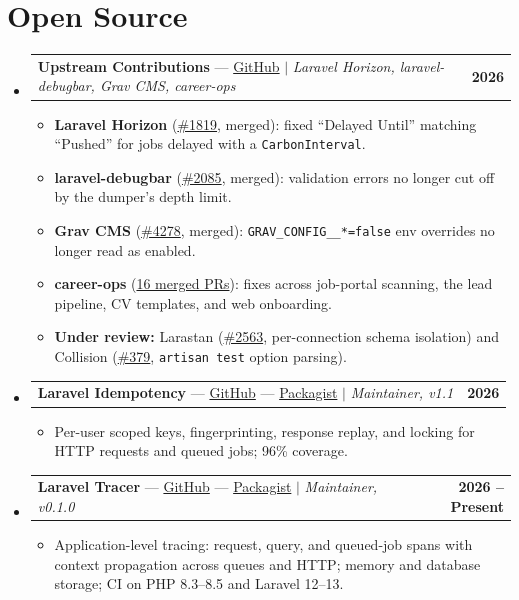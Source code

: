 \documentclass[letterpaper,10pt]{article}
\makeatletter
\newcommand{\resumeItem}[1]{\item\small{{#1 \vspace{-2pt}}}}
\newcommand{\resumeProjectHeading}[2]{
    \item
    \begin{tabular*}{0.97\textwidth}{l@{\extracolsep{\fill}}r}
      \small#1 & \textbf{\small #2} \\
    \end{tabular*}\vspace{-7pt}
}
\newcommand{\resumeSubHeadingListStart}{\begin{itemize}[leftmargin=0.15in, label={}]}
\newcommand{\resumeSubHeadingListEnd}{\end{itemize}}
\newcommand{\resumeItemListStart}{\begin{itemize}[label=--]}
\newcommand{\resumeItemListEnd}{\end{itemize}\vspace{-5pt}}
\makeatother
\begin{document}
\section{Open Source}
  \resumeSubHeadingListStart
    \resumeProjectHeading
      {\textbf{Upstream Contributions} --- \href{https://github.com/AdilAzhariOmsan}{GitHub} $|$ \emph{Laravel Horizon, laravel-debugbar, Grav CMS, career-ops}}{2026}
      \resumeItemListStart
        \resumeItem{\textbf{Laravel Horizon} (\href{https://github.com/laravel/horizon/pull/1819}{\#1819}, merged): fixed ``Delayed Until'' matching ``Pushed'' for jobs delayed with a \texttt{CarbonInterval}.}
        \resumeItem{\textbf{laravel-debugbar} (\href{https://github.com/fruitcake/laravel-debugbar/pull/2085}{\#2085}, merged): validation errors no longer cut off by the dumper's depth limit.}
        \resumeItem{\textbf{Grav CMS} (\href{https://github.com/getgrav/grav/pull/4278}{\#4278}, merged): \texttt{GRAV\_CONFIG\_\_*=false} env overrides no longer read as enabled.}
        \resumeItem{\textbf{career-ops} (\href{https://github.com/career-ops-hq/career-ops/pulls?q=is\%3Apr+author\%3AAdilAzhariOmsan+is\%3Amerged}{16 merged PRs}): fixes across job-portal scanning, the lead pipeline, CV templates, and web onboarding.}
        \resumeItem{\textbf{Under review:} Larastan (\href{https://github.com/larastan/larastan/pull/2563}{\#2563}, per-connection schema isolation) and Collision (\href{https://github.com/nunomaduro/collision/pull/379}{\#379}, \texttt{artisan test} option parsing).}
      \resumeItemListEnd
    \resumeProjectHeading
      {\textbf{Laravel Idempotency} --- \href{https://github.com/AdilAzhariOmsan/laravel-idempotency}{GitHub} --- \href{https://packagist.org/packages/adilazhari/laravel-idempotency}{Packagist} $|$ \emph{Maintainer, v1.1}}{2026}
      \resumeItemListStart
        \resumeItem{Per-user scoped keys, fingerprinting, response replay, and locking for HTTP requests and queued jobs; 96\% coverage.}
      \resumeItemListEnd
    \resumeProjectHeading
      {\textbf{Laravel Tracer} --- \href{https://github.com/AdilAzhariOmsan/laravel-trace}{GitHub} --- \href{https://packagist.org/packages/adilazhari/laravel-trace}{Packagist} $|$ \emph{Maintainer, v0.1.0}}{2026 -- Present}
      \resumeItemListStart
        \resumeItem{Application-level tracing: request, query, and queued-job spans with context propagation across queues and HTTP; memory and database storage; CI on PHP 8.3--8.5 and Laravel 12--13.}
      \resumeItemListEnd
  \resumeSubHeadingListEnd
\end{document}
